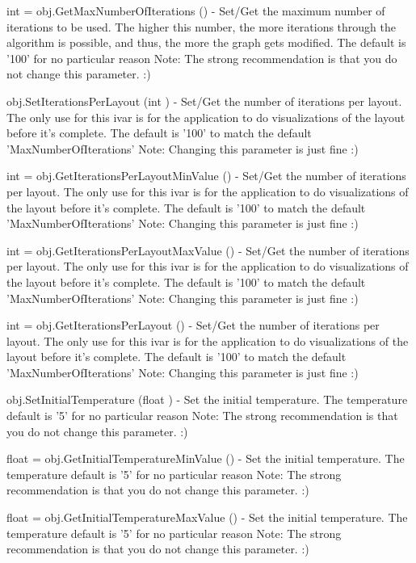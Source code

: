 \begin{DoxyItemize}
\item {\ttfamily int = obj.\-Get\-Max\-Number\-Of\-Iterations ()} -\/ Set/\-Get the maximum number of iterations to be used. The higher this number, the more iterations through the algorithm is possible, and thus, the more the graph gets modified. The default is '100' for no particular reason Note\-: The strong recommendation is that you do not change this parameter. \-:)  
\item {\ttfamily obj.\-Set\-Iterations\-Per\-Layout (int )} -\/ Set/\-Get the number of iterations per layout. The only use for this ivar is for the application to do visualizations of the layout before it's complete. The default is '100' to match the default 'Max\-Number\-Of\-Iterations' Note\-: Changing this parameter is just fine \-:)  
\item {\ttfamily int = obj.\-Get\-Iterations\-Per\-Layout\-Min\-Value ()} -\/ Set/\-Get the number of iterations per layout. The only use for this ivar is for the application to do visualizations of the layout before it's complete. The default is '100' to match the default 'Max\-Number\-Of\-Iterations' Note\-: Changing this parameter is just fine \-:)  
\item {\ttfamily int = obj.\-Get\-Iterations\-Per\-Layout\-Max\-Value ()} -\/ Set/\-Get the number of iterations per layout. The only use for this ivar is for the application to do visualizations of the layout before it's complete. The default is '100' to match the default 'Max\-Number\-Of\-Iterations' Note\-: Changing this parameter is just fine \-:)  
\item {\ttfamily int = obj.\-Get\-Iterations\-Per\-Layout ()} -\/ Set/\-Get the number of iterations per layout. The only use for this ivar is for the application to do visualizations of the layout before it's complete. The default is '100' to match the default 'Max\-Number\-Of\-Iterations' Note\-: Changing this parameter is just fine \-:)  
\item {\ttfamily obj.\-Set\-Initial\-Temperature (float )} -\/ Set the initial temperature. The temperature default is '5' for no particular reason Note\-: The strong recommendation is that you do not change this parameter. \-:)  
\item {\ttfamily float = obj.\-Get\-Initial\-Temperature\-Min\-Value ()} -\/ Set the initial temperature. The temperature default is '5' for no particular reason Note\-: The strong recommendation is that you do not change this parameter. \-:)  
\item {\ttfamily float = obj.\-Get\-Initial\-Temperature\-Max\-Value ()} -\/ Set the initial temperature. The temperature default is '5' for no particular reason Note\-: The strong recommendation is that you do not change this parameter. \-:)  

\end{DoxyItemize}
